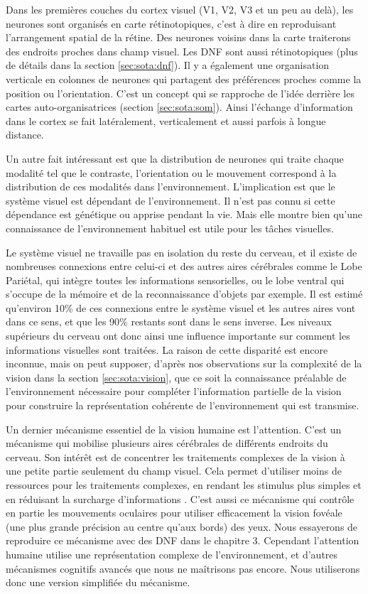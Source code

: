 	Dans les premières couches du cortex visuel (V1, V2, V3 et un peu au delà), les neurones sont organisés en carte rétinotopiques, c'est à dire en reproduisant l'arrangement spatial de la rétine. Des neurones voisins dans la carte traiterons des endroits proches dans champ visuel. Les DNF sont aussi rétinotopiques (plus de détails dans la section \ref{sec:sota:dnf}). Il y a également une organisation verticale en colonnes de neurones qui partagent des préférences proches comme la position ou l'orientation. C'est un concept qui se rapproche de l'idée derrière les cartes auto-organisatrices (section \ref{sec:sota:som}). Ainsi l'échange d'information dans le cortex se fait latéralement, verticalement et aussi parfois à longue distance.

	Un autre fait intéressant est que la distribution de neurones qui traite chaque modalité tel que le contraste, l'orientation ou le mouvement correspond à la distribution de ces modalités dans l'environnement. L'implication est que le système visuel est dépendant de l'environnement. Il n'est pas connu si cette dépendance est génétique ou apprise pendant la vie. Mais elle montre bien qu'une connaissance de l'environnement habituel est utile pour les tâches visuelles.

	Le système visuel ne travaille pas en isolation du reste du cerveau, et il existe de nombreuses connexions entre celui-ci et des autres aires cérébrales comme le Lobe Pariétal, qui intègre toutes les informations sensorielles, ou le lobe ventral qui s'occupe de la mémoire et de la reconnaissance d'objets par exemple. Il est estimé qu'environ 10\% de ces connexions entre le système visuel et les autres aires vont dans ce sens, et que les 90\% restants sont dans le sens inverse. Les niveaux supérieurs du cerveau ont donc ainsi une influence importante sur comment les informations visuelles sont traitées. La raison de cette disparité est encore inconnue, mais on peut supposer, d'après nos observations sur la complexité de la vision dans la section \ref{sec:sota:vision}, que ce soit la connaissance préalable de l'environnement nécessaire pour compléter l'information partielle de la vision pour construire la représentation cohérente de l'environnement qui est transmise.

	Un dernier mécanisme essentiel de la vision humaine est l'attention. C'est un mécanisme qui mobilise plusieurs aires cérébrales de différents endroits du cerveau. Son intérêt est de concentrer les traitements complexes de la vision à une petite partie seulement du champ visuel. Cela permet d'utiliser moins de ressources pour les traitements complexes, en rendant les stimulus plus simples et en réduisant la surcharge d'informations \cite{evans2011visual}. C'est aussi ce mécanisme qui contrôle en partie les mouvements oculaires pour utiliser efficacement la vision fovéale (une plus grande précision au centre qu'aux bords) des yeux. Nous essayerons de reproduire ce mécanisme avec des DNF dans le chapitre 3. Cependant l'attention humaine utilise une représentation complexe de l'environnement, et d'autres mécanismes cognitifs avancés que nous ne maîtrisons pas encore. Nous utiliserons donc une version simplifiée du mécanisme.
	
